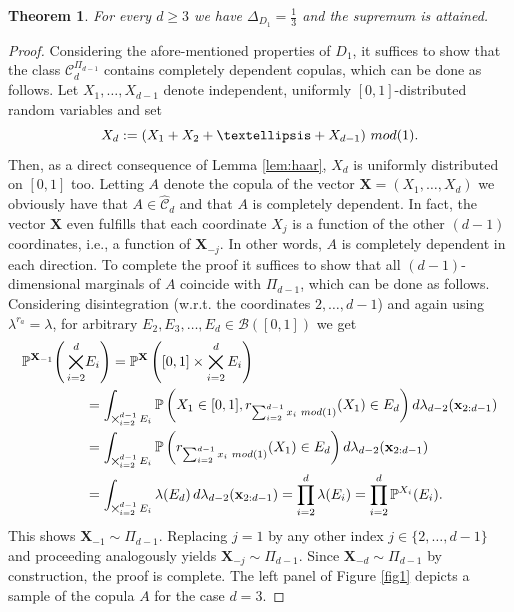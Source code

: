 \documentclass[10pt,a4paper]{amsart}
\newtheorem{theorem}{Theorem}
\newcommand{\kc}{\mathcal{C}}
\begin{document}
\begin{theorem}\label{thm:mainD1}
For every $d \geq 3$ we have $\Delta_{D_1}=\frac{1}{3}$ and the supremum is attained.
\end{theorem}

\begin{proof}
    Considering the afore-mentioned properties of $D_1$, it suffices to show that the class 
    $ \kc_d^{\Pi_{d-1}}$ contains completely 
    dependent copulas, which can be done as follows.
    Let $X_1,\ldots,X_{d-1}$ denote independent, uniformly $[0,1]$-distributed random variables
    and set 
    \begin{equation}\label{eq:defX_q}
        X_d:= (X_1 + X_2 + \ldots + X_{d-1})  \,\, \textup{mod (1)}. 
    \end{equation}
    Then, as a direct consequence of Lemma \ref{lem:haar}, $X_d$ is uniformly distributed on 
    $[0,1]$ too. Letting $A$ denote the copula
    of the vector $\mathbf{X}=(X_1,\ldots,X_d)$ we obviously have that 
    $A \in \hat{\kc}_d$ and that $A$ is completely dependent. In fact, the vector 
    $\mathbf{X}$ even fulfills that each coordinate $X_j$ is a function of the other $(d-1)$ coordinates, i.e., a function of $\mathbf{X}_{-j}$. In other words, $A$ is completely 
    dependent in each direction.     
    To complete the proof it suffices to show that all $(d-1)$-dimensional marginals 
    of $A$ coincide with $\Pi_{d-1}$, which can be done as follows. 
    Considering disintegration (w.r.t. the coordinates $2,\ldots,d-1$) and again using  $\lambda^{r_a}=\lambda$,  
    for arbitrary $E_2,E_3,\ldots, E_d \in \mathcal{B}([0,1])$ we get
    \begin{align*}
        \mathbb{P}^{\mathbf{X}_{-1}} \Bigg(\bigtimes_{i=2}^d &E_i\Bigg) = 
        \mathbb{P}^{\mathbf{X}} \left([0,1] \times \bigtimes_{i=2}^d E_i\right) \\
        &= 
        \int_{\bigtimes_{i=2}^{d-1}E_i} \mathbb{P}\left(X_1 \in [0,1], r_{\sum_{i=2}^{d-1}x_i \,\, \textup{mod (1)}}(X_1) \in E_d \right)d\lambda_{d-2}(\mathbf{x}_{2:d-1}) \\
        &= \int_{\bigtimes_{i=2}^{d-1}E_i} \mathbb{P}\left(r_{\sum_{i=2}^{d-1}x_i \,\, \textup{mod (1)}}(X_1) \in E_d \right)d\lambda_{d-2}(\mathbf{x}_{2:d-1}) \\
        &= \int_{\bigtimes_{i=2}^{d-1}E_i} \lambda(E_d) \,d\lambda_{d-2}(\mathbf{x}_{2:d-1}) 
        = \prod_{i=2}^d \lambda(E_i) = \prod_{i=2}^d \mathbb{P}^{X_i}(E_i). 
        \end{align*}
    This shows $\mathbf{X}_{-1} \sim \Pi_{d-1}$. Replacing $j=1$ by any other index
    $j \in \{2,\ldots,d-1\}$ and proceeding analogously yields $\mathbf{X}_{-j} \sim \Pi_{d-1}$. 
    Since $\mathbf{X}_{-d} \sim \Pi_{d-1}$ by construction, the proof is complete. The left panel of Figure \ref{fig1} depicts a sample of the copula $A$ for 
    the case $d=3$. 
    \end{proof}
\end{document}
